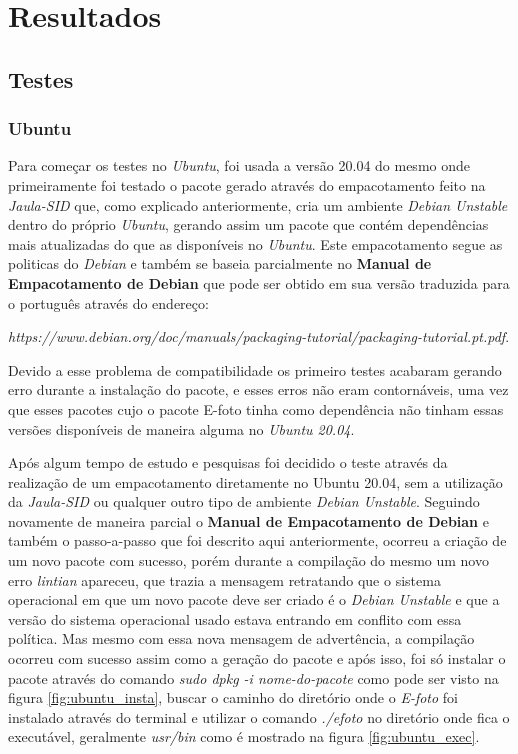 \chapter{Resultados}

\section{Testes}

\subsection{Ubuntu}
Para começar os testes no \textit{Ubuntu}, foi usada a versão 20.04 do mesmo onde primeiramente foi testado o pacote gerado através do empacotamento feito na \textit{Jaula-SID} que, como explicado anteriormente, cria um ambiente \textit{Debian Unstable} dentro do próprio \textit{Ubuntu}, gerando assim um pacote que contém dependências mais atualizadas do que as disponíveis no \textit{Ubuntu}. Este empacotamento segue as politicas do \textit{Debian} e também se baseia parcialmente no \textbf{Manual de Empacotamento de Debian} que pode ser obtido em sua versão traduzida para o português através do endereço:

\textit{https://www.debian.org/doc/manuals/packaging-tutorial/packaging-tutorial.pt.pdf}.
 
Devido a esse problema de compatibilidade os primeiro testes acabaram gerando erro durante a instalação do pacote, e esses erros não eram contornáveis, uma vez que esses pacotes cujo o pacote E-foto tinha como dependência não tinham essas versões disponíveis de maneira alguma no \textit{Ubuntu 20.04}. 

Após algum tempo de estudo e pesquisas foi decidido o teste através da realização de um empacotamento diretamente no Ubuntu 20.04, sem a utilização da \textit{Jaula-SID} ou qualquer outro tipo de ambiente \textit{Debian Unstable}. Seguindo novamente de maneira parcial o \textbf{Manual de Empacotamento de Debian} e também o passo-a-passo que foi descrito aqui anteriormente, ocorreu a criação de um novo pacote com sucesso, porém durante a compilação do mesmo um novo erro \textit{lintian} apareceu, que trazia a mensagem retratando que o sistema operacional em que um novo pacote deve ser criado é o \textit{Debian Unstable} e que a versão do sistema operacional usado estava entrando em conflito com essa política. Mas mesmo com essa nova mensagem de advertência, a compilação ocorreu com sucesso assim como a geração do pacote e após isso, foi só instalar o pacote através do comando \textit{sudo dpkg -i nome-do-pacote} como pode ser visto na figura \ref{fig:ubuntu_insta}, buscar o caminho do diretório onde o \textit{E-foto} foi instalado através do terminal e utilizar o comando \textit{./efoto} no diretório onde fica o executável, geralmente \textit{usr/bin} como é mostrado na figura \ref{fig:ubuntu_exec}.

